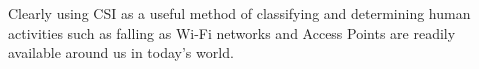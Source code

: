 Clearly using CSI as a useful method of classifying and determining human activities such as falling as Wi-Fi networks and Access Points are readily available around us in today's world. 

